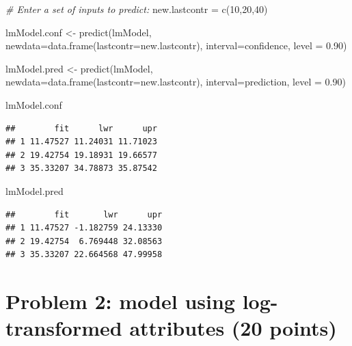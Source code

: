 \documentclass[
]{article}
\newenvironment{Shaded}{\begin{snugshade}}{\end{snugshade}}
\newcommand{\AttributeTok}[1]{\textcolor[rgb]{0.77,0.63,0.00}{#1}}
\newcommand{\CommentTok}[1]{\textcolor[rgb]{0.56,0.35,0.01}{\textit{#1}}}
\newcommand{\DecValTok}[1]{\textcolor[rgb]{0.00,0.00,0.81}{#1}}
\newcommand{\FloatTok}[1]{\textcolor[rgb]{0.00,0.00,0.81}{#1}}
\newcommand{\FunctionTok}[1]{\textcolor[rgb]{0.00,0.00,0.00}{#1}}
\newcommand{\NormalTok}[1]{#1}
\newcommand{\OtherTok}[1]{\textcolor[rgb]{0.56,0.35,0.01}{#1}}
\newcommand{\StringTok}[1]{\textcolor[rgb]{0.31,0.60,0.02}{#1}}
\begin{document}
\begin{Shaded}
\begin{Highlighting}[]
\CommentTok{\# Enter a set of inputs to predict:}
\NormalTok{new.lastcontr }\OtherTok{=} \FunctionTok{c}\NormalTok{(}\DecValTok{10}\NormalTok{,}\DecValTok{20}\NormalTok{,}\DecValTok{40}\NormalTok{)}

\NormalTok{lmModel.conf }\OtherTok{\textless{}{-}} \FunctionTok{predict}\NormalTok{(lmModel,}
        \AttributeTok{newdata=}\FunctionTok{data.frame}\NormalTok{(}\AttributeTok{lastcontr=}\NormalTok{new.lastcontr),}
        \AttributeTok{interval=}\StringTok{\textquotesingle{}confidence\textquotesingle{}}\NormalTok{,}
        \AttributeTok{level =} \FloatTok{0.90}\NormalTok{)}

\NormalTok{lmModel.pred }\OtherTok{\textless{}{-}} \FunctionTok{predict}\NormalTok{(lmModel,}
        \AttributeTok{newdata=}\FunctionTok{data.frame}\NormalTok{(}\AttributeTok{lastcontr=}\NormalTok{new.lastcontr),}
        \AttributeTok{interval=}\StringTok{\textquotesingle{}prediction\textquotesingle{}}\NormalTok{,}
        \AttributeTok{level =} \FloatTok{0.90}\NormalTok{)}

\NormalTok{lmModel.conf}
\end{Highlighting}
\end{Shaded}

\begin{verbatim}
##        fit      lwr      upr
## 1 11.47527 11.24031 11.71023
## 2 19.42754 19.18931 19.66577
## 3 35.33207 34.78873 35.87542
\end{verbatim}

\begin{Shaded}
\begin{Highlighting}[]
\NormalTok{lmModel.pred}
\end{Highlighting}
\end{Shaded}

\begin{verbatim}
##        fit       lwr      upr
## 1 11.47527 -1.182759 24.13330
## 2 19.42754  6.769448 32.08563
## 3 35.33207 22.664568 47.99958
\end{verbatim}

\hypertarget{problem-2-model-using-log-transformed-attributes-20-points}{%
\section{Problem 2: model using log-transformed attributes (20
points)}\label{problem-2-model-using-log-transformed-attributes-20-points}}
\end{document}

